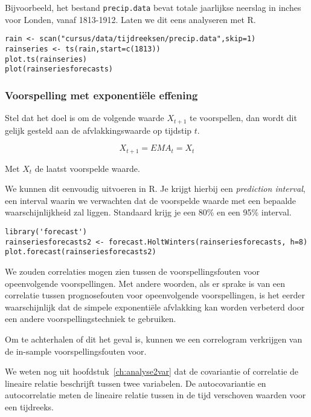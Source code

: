 Bijvoorbeeld, het bestand \texttt{precip.data} bevat totale jaarlijkse neerslag in inches voor Londen, vanaf 1813-1912. Laten we dit eens analyseren met R.

\begin{lstlisting}
rain <- scan("cursus/data/tijdreeksen/precip.data",skip=1)
rainseries <- ts(rain,start=c(1813))
plot.ts(rainseries)
plot(rainseriesforecasts)
\end{lstlisting} 


\subsubsection{Voorspelling met exponentiële effening}

Stel dat het doel is om de volgende waarde $X_{t+1}$ te voorspellen, dan wordt dit gelijk gesteld aan de afvlakkingswaarde op tijdstip $t$.

\begin{equation}
	X_{t+1} = EMA_t = X_t
	\label{eq:EMA}
\end{equation}

Met $X_t$ de laatst voorspelde waarde. 

We kunnen dit eenvoudig uitvoeren in R. Je krijgt hierbij een \emph{prediction interval}, een interval waarin we verwachten dat de voorspelde waarde met een bepaalde waarschijnlijkheid zal liggen. Standaard krijg je een 80\% en een 95\% interval.

\begin{lstlisting} 
library('forecast')
rainseriesforecasts2 <- forecast.HoltWinters(rainseriesforecasts, h=8)
plot.forecast(rainseriesforecasts2)
\end{lstlisting} 

We zouden correlaties mogen zien tussen de voorspellingsfouten voor opeenvolgende voorspellingen. Met andere woorden, als er sprake is van een correlatie tussen prognosefouten voor opeenvolgende voorspellingen, is het eerder waarschijnlijk dat de simpele exponentiële afvlakking kan worden verbeterd door een andere voorspellingstechniek te gebruiken.

Om te achterhalen of dit het geval is, kunnen we een correlogram verkrijgen van de in-sample voorspellingsfouten voor.

We weten nog uit hoofdstuk~\ref{ch:analyse2var} dat de covariantie of correlatie de lineaire relatie beschrijft tussen twee variabelen. De autocovariantie en autocorrelatie meten de lineaire relatie tussen in de tijd verschoven waarden voor een tijdreeks.

